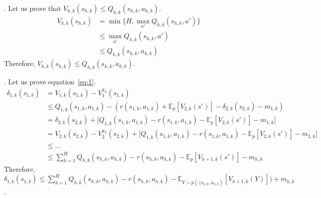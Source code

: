 \documentclass[a4paper]{article}
\begin{document}
\begin{itemize}
	. Let us prove that $V_{h,k}(s_{h,k}) \leq Q_{h,k}(s_{h,k},a_{h,k})$.
	\begin{align*}
		V_{h,k}(s_{h,k}) &= \min \{H, \max_{a'}Q_{h,k}(s_{h,k},a')\} \\
		& \leq \max_{a'}Q_{h,k}(s_{h,k},a') \\
		& \leq Q_{h,k}(s_{h,k},a_{h,k})		
	\end{align*}
	\qquad \qquad Therefore, $\boxed{V_{h,k}(s_{h,k}) \leq Q_{h,k}(s_{h,k},a_{h,k})}$.
	
	. Let us prove equation~\ref{eq:1}.
	\begin{align*}
		\delta_{1,k}(s_{1,k}) &= V_{1,k}(s_{1,k}) - V_1^{\pi_k}(s_{1,k}) \\
		&\leq Q_{1,k}(s_{1,k},a_{1,k}) - \left( r(s_{1,k},a_{1,k}) + \mathbb{E}_{p}[V_{2,k}(s')] - \delta_{2,k}(s_{2,k}) - m_{1,k}\right) \\
		&= \delta_{2,k}(s_{2,k}) + \big[Q_{1,k}(s_{1,k},a_{1,k}) - r(s_{1,k},a_{1,k}) - \mathbb{E}_{p}[V_{2,k}(s')] - m_{1,k}\big] \\
		&= V_{2,k}(s_{2,k}) - V_2^{\pi_k}(s_{2,k}) + \big[Q_{1,k}(s_{1,k},a_{1,k}) - r(s_{1,k},a_{1,k}) - \mathbb{E}_{p}[V_{2,k}(s')] - m_{1,k}\big] \\
		&\leq \dots \\
		&\leq \sum_{h=1}^{H} Q_{h,k}(s_{h,k},a_{h,k}) - r(s_{h,k},a_{h,k}) - \mathbb{E}_{p}[V_{h+1,k}(s')] - m_{h,k}
	\end{align*}
	\qquad \qquad Therefore, $\boxed{\delta_{1,k}(s_{1,k}) \leq \sum_{h=1}^H Q_{h,k}(s_{h,k},a_{h,k}) - r(s_{h,k},a_{h,k}) - \mathbb{E}_{Y\sim p(\cdot|s_{h,k},a_{h,k})}[V_{h+1,k}(Y)]) + m_{h,k}}$.
	

\end{itemize}
\end{document}
